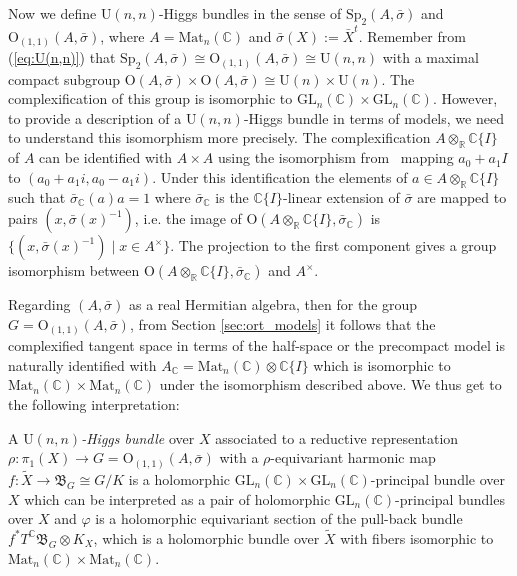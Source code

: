 \documentclass[oneside,11pt]{amsart}
\theoremstyle{definition}
\theoremstyle{remark}
\numberwithin{thm}{section}
\numberwithin{equation}{section}
\begin{document}
Now we define $\mathrm{U}(n,n)$-Higgs bundles in the sense of $\mathrm{Sp}_2(A,\bar\sigma)$ and $\mathrm{O}_{(1,1)}(A,\bar\sigma)$, where $A=\mathrm{Mat}_n(\mathbb{C})$ and $\bar\sigma(X):=\bar{X}^t$. Remember from (\ref{eq:U(n,n)}) that $\mathrm{Sp}_2(A,\bar\sigma)\cong\mathrm{O}_{(1,1)}(A,\bar\sigma)\cong\mathrm{U}(n,n)$ with a maximal compact subgroup $\mathrm{O}(A,\bar\sigma)\times\mathrm{O}(A,\bar\sigma)\cong \mathrm{U}(n)\times\mathrm{U}(n)$. The complexification of this group is isomorphic to $\mathrm{GL}_n(\mathbb C)\times\mathrm{GL}_n(\mathbb C)$. However, to provide a description of a $\mathrm{U}(n,n)$-Higgs bundle in terms of models, we need to understand this isomorphism more precisely. The complexification $A\otimes_\mathbb R\mathbb C\{I\}$ of $A$ can be identified with $A\times A$ using the isomorphism from~\cite[Appendix B.1.1]{ABRRW} mapping $a_0+a_1I$ to $(a_0+a_1i,a_0-a_1i)$. Under this identification the elements of $a\in A\otimes_\mathbb R\mathbb C\{I\}$ such that $\bar\sigma_\mathbb{C}(a)a=1$ where $\bar\sigma_\mathbb{C}$ is the $\mathbb C\{I\}$-linear extension of $\bar\sigma$ are mapped to pairs $(x,\bar\sigma(x)^{-1})$, i.e. the image of $\mathrm{O}(A\otimes_\mathbb R\mathbb C\{I\},\bar\sigma_\mathbb C)$ is $\{(x,\bar\sigma(x)^{-1})\mid x\in A^\times\}$. The projection to the first component gives a group isomorphism between  $\mathrm{O}(A\otimes_\mathbb R\mathbb C\{I\},\bar\sigma_\mathbb C)$ and $A^\times$.


Regarding $(A,\bar\sigma)$ as a real Hermitian algebra, then for the group $G=\mathrm{O}_{(1,1)}(A,\bar\sigma)$, from Section \ref{sec:ort_models} it follows that the complexified tangent space in terms of the half-space or the precompact model is naturally identified with $A_{\mathbb{C}}=\mathrm{Mat}_n(\mathbb{C})\otimes\mathbb{C}\{I\}$ which is isomorphic to $ \mathrm{Mat}_n(\mathbb{C})\times\mathrm{Mat}_n(\mathbb{C})$ under the isomorphism described above. We thus get to the following interpretation:

    A \emph{$\mathrm{U}(n,n)$-Higgs bundle} over $X$ associated to a reductive representation $\rho\colon \pi_1(X)\to G=\mathrm{O}_{(1,1)}(A,\bar\sigma)$ with a $\rho$-equivariant harmonic map $f\colon\tilde X\to \mathfrak B_G\cong G/K$ is a holomorphic $\mathrm{GL}_n(\mathbb C)\times\mathrm{GL}_n(\mathbb C)$-principal bundle over $X$ which can be interpreted as a pair of holomorphic $\mathrm{GL}_n(\mathbb C)$-principal bundles over $X$ and $\varphi$ is a holomorphic equivariant section of the pull-back bundle $f^*T^\mathbb C\mathfrak B_G\otimes K_X$, which is a holomorphic bundle over $\tilde X$ with fibers isomorphic to  $\mathrm{Mat}_n(\mathbb C)\times \mathrm{Mat}_n(\mathbb{C})$.
\end{document}
